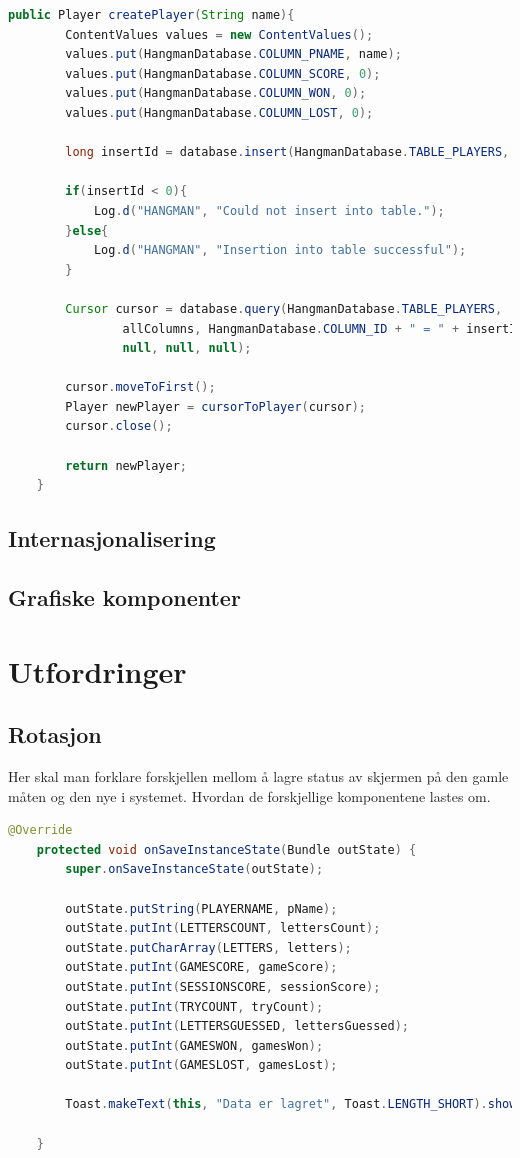 \begin{lstlisting}[language=Java, caption=Metode for oppretting av en ny spiller i tabellen, label=code:tabell_ny_spiller]
public Player createPlayer(String name){
        ContentValues values = new ContentValues();
        values.put(HangmanDatabase.COLUMN_PNAME, name);
        values.put(HangmanDatabase.COLUMN_SCORE, 0);
        values.put(HangmanDatabase.COLUMN_WON, 0);
        values.put(HangmanDatabase.COLUMN_LOST, 0);

        long insertId = database.insert(HangmanDatabase.TABLE_PLAYERS, null, values);

        if(insertId < 0){
            Log.d("HANGMAN", "Could not insert into table.");
        }else{
            Log.d("HANGMAN", "Insertion into table successful");
        }

        Cursor cursor = database.query(HangmanDatabase.TABLE_PLAYERS,
                allColumns, HangmanDatabase.COLUMN_ID + " = " + insertId, null,
                null, null, null);

        cursor.moveToFirst();
        Player newPlayer = cursorToPlayer(cursor);
        cursor.close();

        return newPlayer;
    }
\end{lstlisting}


\section{Internasjonalisering}
\section{Grafiske komponenter}


\chapter{Utfordringer}
\section{Rotasjon}
Her skal man forklare forskjellen mellom å lagre status av skjermen på den gamle måten og den nye i systemet. Hvordan de forskjellige komponentene lastes om. 
\begin{lstlisting}[language=Java]
    @Override
    protected void onSaveInstanceState(Bundle outState) {
        super.onSaveInstanceState(outState);

        outState.putString(PLAYERNAME, pName);
        outState.putInt(LETTERSCOUNT, lettersCount);
        outState.putCharArray(LETTERS, letters);
        outState.putInt(GAMESCORE, gameScore);
        outState.putInt(SESSIONSCORE, sessionScore);
        outState.putInt(TRYCOUNT, tryCount);
        outState.putInt(LETTERSGUESSED, lettersGuessed);
        outState.putInt(GAMESWON, gamesWon);
        outState.putInt(GAMESLOST, gamesLost);

        Toast.makeText(this, "Data er lagret", Toast.LENGTH_SHORT).show();

    }
\end{lstlisting}

